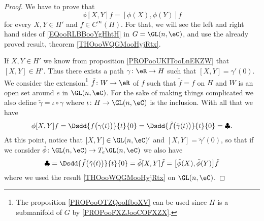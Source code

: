 \begin{proof}
    We have to prove that
    \begin{equation}        \label{EQooRLBBooYgHhtH}
        \phi[X,Y]f=[\phi(X),\phi(Y)]f
    \end{equation}
    for every \( X,Y\in H'\) and \( f\in  C^{\infty}(H)\). For that, we will see the left and right hand sides of \eqref{EQooRLBBooYgHhtH} in \( G=\GL(n,\eC)\), and use the already proved result, theorem \ref{THOooWQGMooHyjRtx}.

    If \( X,Y\in H'\) we know from proposition \ref{PROPooUKITooLnEKZW} that \( [X,Y]\in H'\). Thus there exists a path \( \gamma\colon \eR\to H\) such that \( [X,Y]=\gamma'(0)\). We consider the extension\footnote{The proposition \ref{PROPooOTZQooIfboXV} can be used since \( H\) is a submanifold of \( G\) by \ref{PROPooFXZJooCOFXZX}.} \( \tilde f\colon W\to \eR\) of \( f\) such that \( \tilde f=f\) on \( H\) and \( W\) is an open set around \( e\) in \( \GL(n,\eC)\). For the sake of making things complicated we also define \( \tilde \gamma=\iota\circ \gamma\) where \( \iota\colon H\to \GL(n,\eC)\) is the inclusion. With all that we have
    \begin{equation}
        \phi[X,Y]f=\Dsdd{ f\big( \gamma(t) \big) }{t}{0}=\Dsdd{ \tilde f\big( \tilde \gamma(t) \big) }{t}{0}=\clubsuit.
    \end{equation}
    At this point, notice that \( [X,Y]\in \GL(n,\eC)'\) and \( [X,Y]=\tilde \gamma'(0)\), so that if we consider \( \tilde \phi\colon \GL(n,\eC)\to T_e\GL(n,\eC)\) we also have
    \begin{equation}
        \clubsuit=\Dsdd{ \tilde f\big( \tilde \gamma(t) \big) }{t}{0}=\tilde \phi[X,Y]\tilde f=\big[ \tilde \phi(X),\tilde \phi(Y) \big]\tilde f
    \end{equation}
    where we used the result \ref{THOooWQGMooHyjRtx} on \( \GL(n,\eC)\).


\end{proof}
